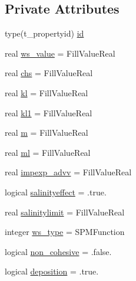 \subsection*{Private Attributes}
\begin{DoxyCompactItemize}
\item 
type(t\+\_\+propertyid) \mbox{\hyperlink{structmodulefreeverticalmovement_1_1t__property_afd0e6ab24e67e2a071f97f8c1ec489ef}{id}}
\item 
real \mbox{\hyperlink{structmodulefreeverticalmovement_1_1t__property_a0608e99eac44a341b656290e33686db3}{ws\+\_\+value}} = Fill\+Value\+Real
\item 
real \mbox{\hyperlink{structmodulefreeverticalmovement_1_1t__property_a74e08f5eb8fa3d46d79946bf91d020a3}{chs}} = Fill\+Value\+Real
\item 
real \mbox{\hyperlink{structmodulefreeverticalmovement_1_1t__property_addc73c983c93450f07e2aa7c6f9d7127}{kl}} = Fill\+Value\+Real
\item 
real \mbox{\hyperlink{structmodulefreeverticalmovement_1_1t__property_a505c792bd586a93e74fbe735e921cf81}{kl1}} = Fill\+Value\+Real
\item 
real \mbox{\hyperlink{structmodulefreeverticalmovement_1_1t__property_aeb04603d8cbaa87fe674378ea11dd65e}{m}} = Fill\+Value\+Real
\item 
real \mbox{\hyperlink{structmodulefreeverticalmovement_1_1t__property_ad988a1005bfc49aa1c0dde136b7d94d7}{ml}} = Fill\+Value\+Real
\item 
real \mbox{\hyperlink{structmodulefreeverticalmovement_1_1t__property_afb5e8fb5c8710f26ff173e1efb89aa9f}{impexp\+\_\+advv}} = Fill\+Value\+Real
\item 
logical \mbox{\hyperlink{structmodulefreeverticalmovement_1_1t__property_a787dd165ce7410bb9aeb8323198804a0}{salinityeffect}} = .true.
\item 
real \mbox{\hyperlink{structmodulefreeverticalmovement_1_1t__property_ac727607e0f4ab8909279a4c199b43335}{salinitylimit}} = Fill\+Value\+Real
\item 
integer \mbox{\hyperlink{structmodulefreeverticalmovement_1_1t__property_a4e5bc640f29c4aae1e74ec5b91731eaa}{ws\+\_\+type}} = S\+P\+M\+Function
\item 
logical \mbox{\hyperlink{structmodulefreeverticalmovement_1_1t__property_a3508dcbeba87da88beed4a28972a3bbe}{non\+\_\+cohesive}} = .false.
\item 
logical \mbox{\hyperlink{structmodulefreeverticalmovement_1_1t__property_a2d5b4e17ef056537d082b3d21ab7a916}{deposition}} = .true.

\end{DoxyCompactItemize}

